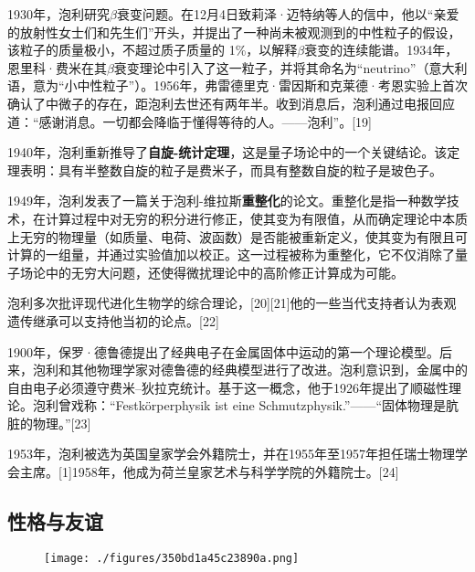 1930年，泡利研究\(\beta\)衰变问题。在12月4日致莉泽·迈特纳等人的信中，他以“亲爱的放射性女士们和先生们”开头，并提出了一种尚未被观测到的中性粒子的假设，该粒子的质量极小，不超过质子质量的 1\%，以解释\(\beta\)衰变的连续能谱。1934年，恩里科·费米在其\(\beta\)衰变理论中引入了这一粒子，并将其命名为“neutrino”（意大利语，意为“小中性粒子”）。1956年，弗雷德里克·雷因斯和克莱德·考恩实验上首次确认了中微子的存在，距泡利去世还有两年半。收到消息后，泡利通过电报回应道：“感谢消息。一切都会降临于懂得等待的人。——泡利”。[19]

1940年，泡利重新推导了\textbf{自旋-统计定理}，这是量子场论中的一个关键结论。该定理表明：具有半整数自旋的粒子是费米子，而具有整数自旋的粒子是玻色子。

1949年，泡利发表了一篇关于泡利-维拉斯\textbf{重整化}的论文。重整化是指一种数学技术，在计算过程中对无穷的积分进行修正，使其变为有限值，从而确定理论中本质上无穷的物理量（如质量、电荷、波函数）是否能被重新定义，使其变为有限且可计算的一组量，并通过实验值加以校正。这一过程被称为重整化，它不仅消除了量子场论中的无穷大问题，还使得微扰理论中的高阶修正计算成为可能。

泡利多次批评现代进化生物学的综合理论，[20][21]他的一些当代支持者认为表观遗传继承可以支持他当初的论点。[22]

1900年，保罗·德鲁德提出了经典电子在金属固体中运动的第一个理论模型。后来，泡利和其他物理学家对德鲁德的经典模型进行了改进。泡利意识到，金属中的自由电子必须遵守费米–狄拉克统计。基于这一概念，他于1926年提出了顺磁性理论。泡利曾戏称：“Festkörperphysik ist eine Schmutzphysik.”——“固体物理是肮脏的物理。”[23]

1953年，泡利被选为英国皇家学会外籍院士，并在1955年至1957年担任瑞士物理学会主席。[1]1958年，他成为荷兰皇家艺术与科学学院的外籍院士。[24]
\subsection{性格与友谊}
\begin{figure}[ht]
\centering
\texttt{[image: ./figures/350bd1a45c23890a.png]}
\caption{} \label{fig_Pauli2_4}
\end{figure}